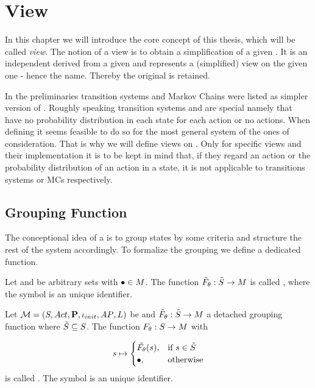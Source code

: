 \documentclass[preview]{standalone}
\begin{document}
	
\section{View}  \label{ch:view}

In this chapter we will introduce the core concept of this thesis, which will be called \emph{view}. The notion of a view is to obtain a simplification of a given \mdpN. It is an independent \mdpN derived from a given \mdpN and represents a (simplified) view on the given one - hence the name. Thereby the original \mdpN is retained.

In the preliminaries transition systems and Markov Chains were listed as simpler version of \mdpsN. Roughly speaking transition systems and \mdpsN are special \mdpsN namely that have no probability distribution in each state for each action or no actions. When defining \viewsN it seems feasible to do so for the most general system of the ones of consideration. That is why we will define views on \mdpsN. Only for specific views and their implementation it is to be kept in mind that, if they regard an action or the probability distribution of an action in a state, it is not applicable to transitions systems or MCs respectively.

\subsection{Grouping Function}
The conceptional idea of a \viewN is to group states by some criteria and structure the rest of the system accordingly. To formalize the grouping we define a dedicated function.

\begin{definition}
	Let \smstates and \arbset be arbitrary sets with ${\bullet} \in {M}$. The function ${\tilde{F}_{{\theta}}} : {\tilde{{S}}} \to {\ensuremath{{M}}}$ is called \emph{\grpfctsubN}, where the symbol \viewppty is an unique identifier.
	
	\label{def:grpfctsub}
\end{definition}


\begin{definition}
	Let ${{{\mathcal{M}}}} = {{({S}, {Act}, {\textbf{P}}, {\iota_{init}}, {AP}, {L})}}$ be \achgphN and ${\tilde{F}_{{\theta}}} : {\tilde{{S}}} \to {\ensuremath{{M}}}$ a detached grouping function where ${\tilde{{S}}} \subseteq {S}$. The function ${F_{{\theta}}} : {S} \to {\ensuremath{{M}}}$ with	
	
	\[
	\state \mapsto
	\begin{cases}
		\tilde\grpfct(s),				& \text{if } \state \in \smstates \\ 		\remelem,          	& \text{otherwise}
	\end{cases}
	\]	
	is called \emph{\grpfctN}. The symbol \viewppty is an unique identifier.
	
	\label{def:grpfct}
\end{definition}
\end{document}

